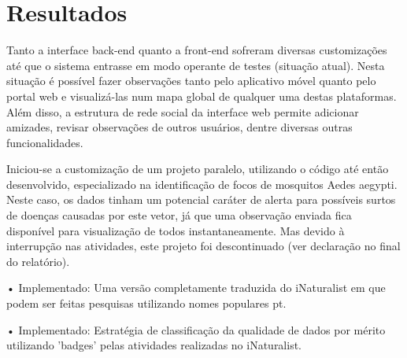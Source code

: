\section{Resultados}
  
Tanto a interface back-end quanto a front-end sofreram diversas customizações até que o sistema entrasse em modo operante de testes (situação atual). Nesta situação é possível fazer observações tanto pelo aplicativo móvel quanto pelo portal web e visualizá-las num mapa global de qualquer uma destas plataformas. Além disso, a estrutura de rede social da interface web permite adicionar amizades, revisar observações de outros usuários, dentre diversas outras funcionalidades.
  
Iniciou-se a customização de um projeto paralelo, utilizando o código até então desenvolvido, especializado na identificação de focos de mosquitos Aedes aegypti. Neste caso, os dados tinham um potencial caráter de alerta para possíveis surtos de doenças causadas por este vetor, já que uma observação enviada fica disponível para visualização de todos instantaneamente. Mas devido à interrupção nas atividades, este projeto foi descontinuado (ver declaração no final do relatório).
    
• Implementado: Uma versão completamente traduzida do iNaturalist em que podem ser feitas pesquisas utilizando nomes populares pt.
    
• Implementado: Estratégia de classificação da qualidade de dados por mérito utilizando 'badges' pelas atividades realizadas no iNaturalist.